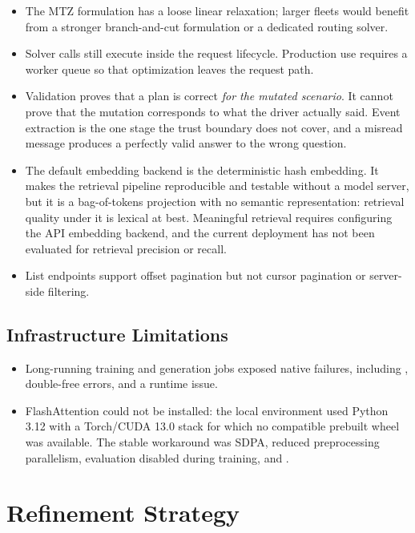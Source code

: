 \documentclass[11pt,a4paper]{article}
\begin{document}
\begin{itemize}
  \item The MTZ formulation has a loose linear relaxation; larger fleets would benefit from a
        stronger branch-and-cut formulation or a dedicated routing solver.
  \item Solver calls still execute inside the request lifecycle. Production use requires a worker
        queue so that optimization leaves the request path.
  \item Validation proves that a plan is correct \emph{for the mutated scenario}. It cannot prove
        that the mutation corresponds to what the driver actually said. Event extraction is the one
        stage the trust boundary does not cover, and a misread message produces a perfectly valid
        answer to the wrong question.
  \item The default embedding backend is the deterministic hash embedding. It makes the retrieval
        pipeline reproducible and testable without a model server, but it is a bag-of-tokens
        projection with no semantic representation: retrieval quality under it is lexical at best.
        Meaningful retrieval requires configuring the API embedding backend, and the current
        deployment has not been evaluated for retrieval precision or recall.
  \item List endpoints support offset pagination but not cursor pagination or server-side filtering.
\end{itemize}

\subsection{Infrastructure Limitations}

\begin{itemize}
  \item Long-running training and generation jobs exposed native failures, including
        , double-free errors, and a  runtime issue.
  \item FlashAttention could not be installed: the local environment used Python 3.12 with a
        Torch/CUDA 13.0 stack for which no compatible prebuilt wheel was available. The stable
        workaround was SDPA, reduced preprocessing parallelism, evaluation disabled during training,
        and .
\end{itemize}

\section{Refinement Strategy}
\end{document}
